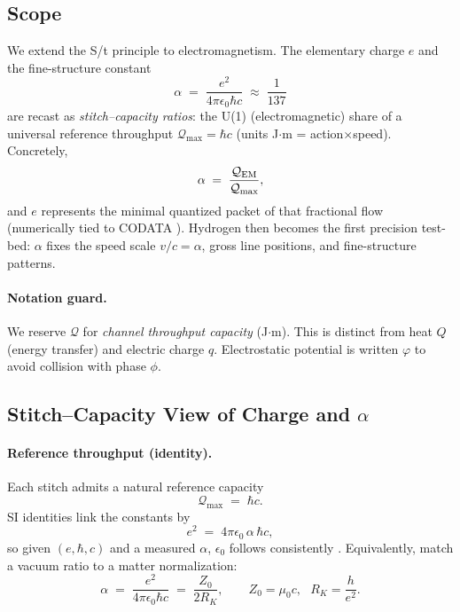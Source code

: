 \documentclass[11pt,oneside]{article}
\begin{document}
\subsection*{Scope}
We extend the S/t principle to electromagnetism. The elementary charge $e$ and the fine-structure constant
\begin{equation}
\alpha \;=\; \frac{e^2}{4\pi\epsilon_0\hbar c} \;\approx\; \frac{1}{137}
\end{equation}
are recast as \emph{stitch--capacity ratios}: the U(1) (electromagnetic) share of a universal reference throughput $\mathcal Q_{\max}=\hbar c$ (units J$\cdot$m = action$\times$speed). Concretely,
\begin{equation}
\alpha \;=\; \frac{\mathcal Q_{\rm EM}}{\mathcal Q_{\max}},
\end{equation}
and $e$ represents the minimal quantized packet of that fractional flow (numerically tied to CODATA \cite{tiesinga2021codata}). Hydrogen then becomes the first precision test-bed: $\alpha$ fixes the speed scale $v/c=\alpha$, gross line positions, and fine-structure patterns.

\paragraph{Notation guard.}
We reserve $\mathcal Q$ for \emph{channel throughput capacity} (J$\cdot$m). This is distinct from heat $Q$ (energy transfer) and electric charge $q$. Electrostatic potential is written $\varphi$ to avoid collision with phase $\phi$.

\subsection{Stitch--Capacity View of Charge and \texorpdfstring{$\alpha$}{alpha}}

\paragraph{Reference throughput (identity).}
Each stitch admits a natural reference capacity
\begin{equation}
\mathcal Q_{\max}\;=\;\hbar c.
\end{equation}
SI identities link the constants by
\begin{equation}
e^2 \;=\; 4\pi\epsilon_0\,\alpha\,\hbar c,
\end{equation}
so given $(e,\hbar,c)$ and a measured $\alpha$, $\epsilon_0$ follows consistently \cite{bipm2019si,tiesinga2021codata}. Equivalently, match a vacuum ratio to a matter normalization:
\begin{equation}
\alpha \;=\; \frac{e^2}{4\pi\epsilon_0\hbar c}
\;=\; \frac{Z_0}{2 R_K},
\qquad
Z_0=\mu_0 c,\ \ \ R_K=\frac{h}{e^2}.
\end{equation}
\end{document}
